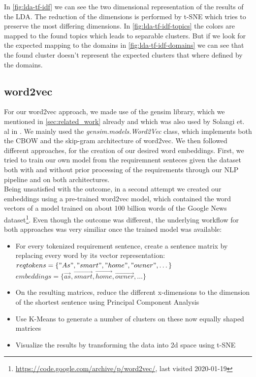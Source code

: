 In \autoref{fig:lda-tf-idf} we can see the two dimensional representation of the results of the LDA. The reduction of the dimensions is performed by t-SNE which tries to preserve the most differing dimensions. In \autoref{fig:lda-tf-idf-topics} the colors are mapped to the found topics which leads to separable clusters. But if we look for the expected mapping to the domains in \autoref{fig:lda-tf-idf-domains} we can see that the found cluster doesn't represent the expected clusters that where defined by the domains.

\subsection{word2vec} %
\label{sub:own_word2vec}
For our word2vec approach, we made use of the gensim library, which we mentioned in \autoref{sec:related_work} already and which was also used by Solangi et. al in \cite{solangi_review_2018}. We mainly used the \emph{gensim.models.Word2Vec} class, which implements both the CBOW and the skip-gram architecture of word2vec. We then followed different approaches, for the creation of our desired word embeddings. First, we tried to train our own model from the requiremnent senteces given the \crowdre{} dataset both with and without prior processing of the requirements through our NLP pipeline and on both architectures.\\
Being unsatisfied with the outcome, in a second attempt we created our embeddings using a pre-trained word2vec model, which contained the word vectors of a model trained on about 100 billion words of the Google News dataset\footnote{\url{https://code.google.com/archive/p/word2vec/}, last visited 2020-01-19}. Even though the outcome was different, the underlying workflow for both approaches was very similiar once the trained model was available:
\begin{itemize}
	\item For every tokenized requirement sentence, create a sentence matrix by replacing every word by its vector representation:\\
	$reqtokens = \{"As", "smart", "home", "owner", \dots\}$\\
	$embeddings = \{ \vec{as}, \vec{smart}, \vec{home}, \vec{owner}, \dots \}$
	\item On the resulting matrices, reduce the different x-dimensions to the dimension of the shortest sentence using Principal Component Analysis
	\item Use K-Means to generate a number of clusters on these now equally shaped matrices
	\item Visualize the results by transforming the data into 2d space using t-SNE\cite{maaten_visualizing_2008}
\end{itemize}


